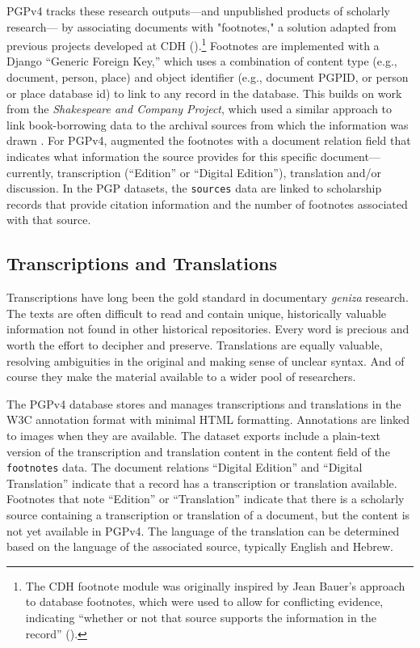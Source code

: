 \documentclass{article}
\begin{document}
PGPv4 tracks these research outputs—and unpublished products of scholarly research— by associating documents with "footnotes," a solution adapted from previous projects developed at CDH (\citeyear{koeser_princeton-cdhmep-django_2022, koeser_derrida-django_2021}).\footnote{The CDH footnote module was originally inspired by Jean Bauer’s approach to database footnotes, which were used to allow for conflicting evidence, indicating “whether or not that source supports the information in the record” (\citeyear{noauthor_tales_2012}).} Footnotes are implemented with a Django “Generic Foreign Key,” which uses a combination of content type (e.g., document, person, place) and object identifier (e.g., document PGPID, or person or place database id) to link to any record in the database. This builds on work from the \textit{Shakespeare and Company Project}, which used a similar approach to link book-borrowing data to the archival sources from which the information was drawn \autocite[18]{kotin_shakespeare_2022}. For PGPv4,  augmented the footnotes with a document relation field that indicates what information the source provides for this specific document—currently, transcription (“Edition” or “Digital Edition”), translation and/or discussion. In the PGP datasets, the \texttt{sources} data are linked to scholarship records that provide citation information and the number of footnotes associated with that source.

\subsection{Transcriptions and Translations}
Transcriptions have long been the gold standard in documentary \textit{geniza} research. The texts are often difficult to read and contain unique, historically valuable information not found in other historical repositories. Every word is precious and worth the effort to decipher and preserve. Translations are equally valuable, resolving ambiguities in the original and making sense of unclear syntax. And of course they make the material available to a wider pool of researchers.

The PGPv4 database stores and manages transcriptions and translations in the W3C annotation format with minimal HTML formatting. Annotations are linked to images when they are available. The dataset exports include a plain-text version of the transcription and translation content in the content field of the \texttt{footnotes} data. The document relations “Digital Edition” and “Digital Translation” indicate that a record has a  transcription or translation available. Footnotes that note “Edition” or “Translation” indicate that there is a scholarly source containing a transcription or translation of a document, but the content is not yet available in PGPv4. The language of the translation can be determined based on the language of the associated source, typically English and Hebrew.
\end{document}
